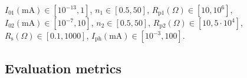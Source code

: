 \documentclass[a4paper,fleqn]{cas-dc}
\begin{document}
\noindent
$I_{01}(\mathrm{mA})\in[10^{-13},1]$,
$n_1\in[0.5,50]$,
$R_\mathrm{p1}(\Omega)\in[10,10^6]$,
$I_{02}(\mathrm{mA})\in[10^{-7},10]$,
$n_2\in[0.5,50]$,
$R_\mathrm{p2}(\Omega)\in[10,5\cdot10^4]$,
$R_\mathrm{s}(\Omega)\in[0.1,1000]$,
$I_\mathrm{ph}(\mathrm{mA})\in[10^{-3},100]$.

\subsection{Evaluation metrics}\label{EvalCr}
\end{document}
